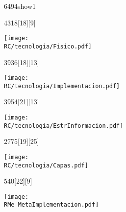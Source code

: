\begin{NuevaPagina}{64}{94}{show1}
	\begin{NuevoParrafo}{43}{18}[18][9]
		\begin{Marco}[\LineaSupC][\LineaInfC][\LineaIzqC][\LineaDerC][CBlanco]
			\subseccionC{\PVFis}%
			\centering\texttt{[image: \\RC/tecnologia/Fisico.pdf]}
		\end{Marco}
	\end{NuevoParrafo}
	
	
	\begin{NuevoParrafo}{39}{36}[18][13]
		\begin{Marco}[\LineaSupC][\LineaInfC][\LineaIzqC][\LineaDerC][CBlanco]
			\subseccionC{\PVDIm}%
			\centering\texttt{[image: \\RC/tecnologia/Implementacion.pdf]}
		\end{Marco}
	\end{NuevoParrafo}
	\begin{NuevoParrafo}{39}{54}[21][13]
		\begin{Marco}[\LineaSupC][\LineaInfC][\LineaIzqC][\LineaDerC][CBlanco]			
			\subseccionC{\PVEIn}%
			\centering\texttt{[image: \\RC/tecnologia/EstrInformacion.pdf]}
		\end{Marco}
	\end{NuevoParrafo}
	
	\begin{NuevoParrafo}{27}{75}[19][25]
		\begin{Marco}[\LineaSupC][\LineaInfC][\LineaIzqC][\LineaDerC][CBlanco]			
			\subseccionC{\PVCap}%
			\centering\texttt{[image: \\RC/tecnologia/Capas.pdf]}
		\end{Marco}
	\end{NuevoParrafo}
	
	\begin{NuevoParrafo}{54}{0}[22][9]
		\begin{Marco}[\LineaSupC][\LineaInfC][\LineaIzqC][\LineaDerC][CBlanco]
			\centering\texttt{[image: \\RMe MetaImplementacion.pdf]}
		\end{Marco}
	\end{NuevoParrafo}
	

\end{NuevaPagina}
